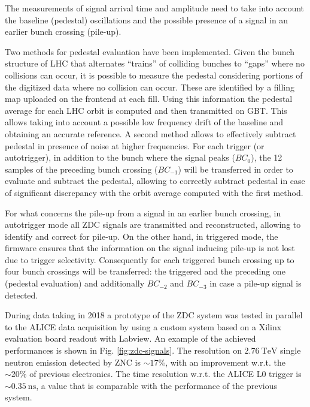 The measurements of signal arrival time and amplitude need to take into account the baseline (pedestal) oscillations and the possible presence of a signal in an earlier bunch crossing (pile-up).

Two methods for pedestal evaluation have been implemented. Given the bunch structure of LHC that alternates ``trains'' of colliding bunches to ``gaps'' where no collisions can occur, it is possible to measure the pedestal considering portions of the digitized data where no collision can occur. These are identified by a filling map uploaded on the frontend at each fill. Using this information the pedestal average for each LHC orbit is computed and then transmitted on GBT. This allows taking into account a possible low frequency drift of the baseline and obtaining an accurate reference. A second method allows to effectively subtract pedestal in presence of noise at higher frequencies. For each trigger (or autotrigger), in addition to the bunch where the signal peaks ($BC_0$), the 12 samples of the preceding bunch crossing ($BC_{-1}$) will be transferred in order to evaluate and subtract the pedestal, allowing to correctly subtract pedestal in case of significant discrepancy with the orbit average computed with the first method.

For what concerns the pile-up from a signal in an earlier bunch crossing, in autotrigger mode all ZDC signals are transmitted and reconstructed, allowing to identify and correct for pile-up. On the other hand, in triggered mode, the firmware ensures that the information on the signal inducing pile-up is not lost due to trigger selectivity. Consequently for each triggered bunch crossing up to four bunch crossings will be transferred: the triggered and the preceding one (pedestal evaluation) and additionally $BC_{-2}$ and $BC_{-3}$ in case a pile-up signal is detected.

During \PbPb data taking in 2018 a prototype of the ZDC system was tested in parallel to the ALICE data acquisition by using a custom system based on a Xilinx evaluation board readout with Labview. An example of the achieved performances is shown in Fig. \ref{fig:zdc-signals}. The resolution on $\SI{2.76}{\tera\electronvolt}$ single neutron emission detected by ZNC is $\sim17\%$, with an improvement w.r.t. the $\sim20\%$ of previous electronics. The time resolution w.r.t. the ALICE L0 trigger is $\sim\SI{0.35}{\nano\second}$, a value that is comparable with the performance of the previous system.

